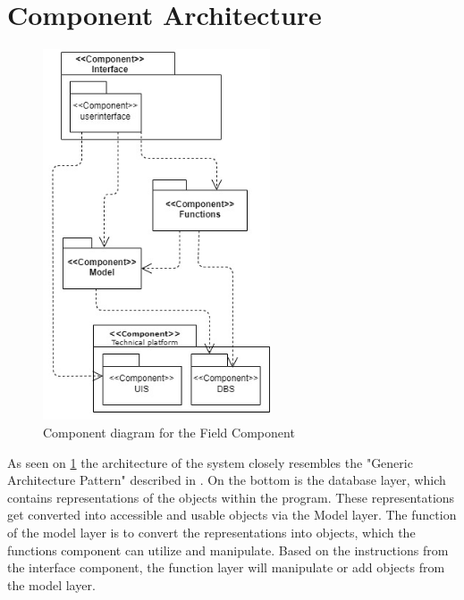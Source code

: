 \section{Component Architecture} \label{sc:component_architecture}
\begin{figure}[H]
    \centering
    \includegraphics[width=0.6\textwidth]{figures/Componentdiagram.jpg}
    \caption{Component diagram for the Field Component}
    \label{fig:ComponentDesign}
\end{figure}
As seen on \ref{fig:ComponentDesign} the architecture of the system closely resembles the "Generic Architecture Pattern" described in .
On the bottom is the database layer, which contains representations of the objects within the program. These representations get converted into accessible and usable objects via the Model layer. The function of the model layer is to convert the representations into objects, which the functions component can utilize and manipulate. Based on the instructions from the interface component, the function layer will manipulate or add objects from the model layer.